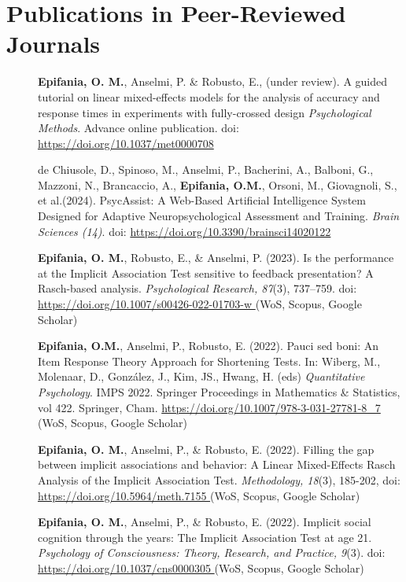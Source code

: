 \documentclass[letterpaper,12pt]{article}
\begin{document}
\section{Publications in Peer-Reviewed Journals}
\begin{description}
	\item[] \textbf{Epifania, O. M.}, Anselmi, P. \& Robusto, E., (under review).	A guided tutorial on linear mixed-effects models for the analysis of accuracy and response times in experiments with fully-crossed design \emph{Psychological Methods}. Advance online publication. doi: \url{https://doi.org/10.1037/met0000708}
	
	\item[] de Chiusole, D., Spinoso, M.,
	Anselmi, P., Bacherini, A., Balboni, G.,
	Mazzoni, N., Brancaccio, A., \textbf{Epifania,
	O.M.}, Orsoni, M., Giovagnoli, S., et al.(2024). PsycAssist: A Web-Based Artificial Intelligence System Designed
	for Adaptive Neuropsychological Assessment and Training. \emph{Brain Sciences (14)}. doi: \url{https://doi.org/10.3390/brainsci14020122}
	


\item[] \textbf{Epifania, O. M.}, Robusto, E., \& Anselmi, P. (2023). Is the performance at the Implicit Association Test sensitive to feedback presentation? A Rasch-based analysis. \emph{Psychological
	Research, 87}(3), 737--759. doi: \href{https://doi.org/10.1007/s00426-022-01703-w}{https://doi.org/10.1007/s00426-022-01703-w } (WoS, Scopus, Google Scholar)

	\item[] \textbf{Epifania, O.M.}, Anselmi, P., Robusto, E. (2022). Pauci sed boni: An Item Response Theory Approach for Shortening Tests. In: Wiberg, M., Molenaar, D., González, J., Kim, JS., Hwang, H. (eds) \emph{Quantitative Psychology}. IMPS 2022. Springer Proceedings in Mathematics \& Statistics, vol 422. Springer, Cham. \url{https://doi.org/10.1007/978-3-031-27781-8_7 } (WoS, Scopus, Google Scholar)
	
\item[] \textbf{Epifania, O. M.}, Anselmi, P., \& Robusto, E. (2022). Filling the gap between implicit associations and behavior: A Linear Mixed-Effects Rasch Analysis of the Implicit Association Test. \emph{Methodology, 18}(3), 185-202, doi: \url{https://doi.org/10.5964/meth.7155 } (WoS, Scopus, Google Scholar)
\item[] \textbf{Epifania, O. M.}, Anselmi, P., \& Robusto, E. (2022). Implicit social cognition through the years: The Implicit Association Test at age 21. \emph{Psychology of Consciousness: Theory, Research, and Practice, 9}(3). doi: \url{https://doi.org/10.1037/cns0000305 } (WoS, Scopus, Google Scholar)


\end{description}
\end{document}
